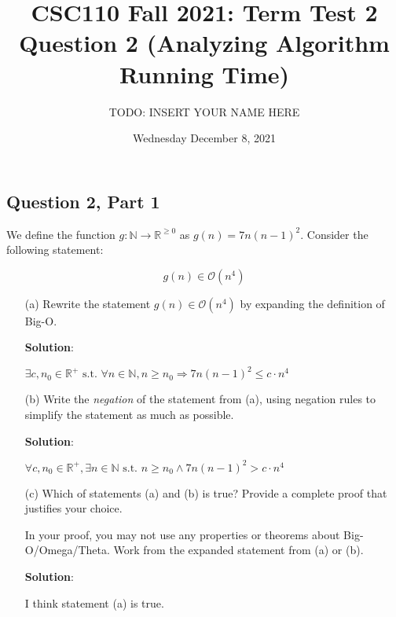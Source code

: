 \documentclass{article}
\title{CSC110 Fall 2021: Term Test 2\\
       Question 2 (Analyzing Algorithm Running Time)}
\author{TODO: INSERT YOUR NAME HERE}
\date{Wednesday December 8, 2021}
\newcommand{\N}{\mathbb{N}}
\newcommand{\R}{\mathbb{R}}
\newcommand{\cO}{\mathcal{O}}
\begin{document}
\maketitle

\subsection*{Question 2, Part 1}

\noindent
We define the function $g: \N \to \R^{\geq 0}$ as $g(n) = 7n(n-1)^2$.
Consider the following statement:

\[
g(n) \in \cO(n^4)
\]

\begin{enumerate}

\item[(a)]
Rewrite the statement $g(n) \in \cO(n^4)$ by expanding the definition of Big-O.

\bigskip

\textbf{Solution}:

$\exists c, n_0 \in \R^+ \text{ s.t. } \forall n \in \N, n \ge n_0 \Rightarrow 7n(n-1)^2 \le c \cdot n^4$

\item[(b)]
Write the \emph{negation} of the statement from (a), using negation rules to simplify the statement as much as possible.

\bigskip

\textbf{Solution}:

$\forall c, n_0 \in \R^+, \exists n \in \N \text{ s.t. } n \ge n_0 \land 7n(n-1)^2 > c \cdot n^4$

\item[(c)]
Which of statements (a) and (b) is true? Provide a complete proof that justifies your choice.

In your proof, you may not use any properties or theorems about Big-O/Omega/Theta.  Work from the expanded statement from (a) or (b).

\bigskip

\textbf{Solution}:

I think statement (a) is true.


\end{enumerate}
\end{document}
